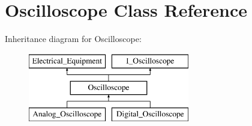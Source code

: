 \hypertarget{class_oscilloscope}{}\section{Oscilloscope Class Reference}
\label{class_oscilloscope}
Inheritance diagram for Oscilloscope\+:\begin{figure}[H]
\begin{center}
\leavevmode
\includegraphics[height=3.000000cm]{class_oscilloscope}
\end{center}
\end{figure}
